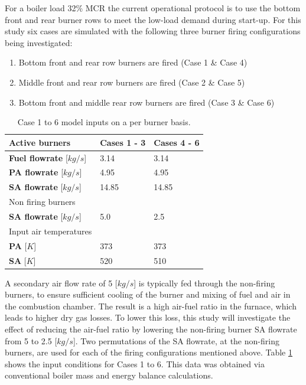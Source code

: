 \documentclass[twocolumn,10pt]{asme2ej}
\begin{document}
For a boiler load 32\% MCR the current operational protocol is to use the bottom front and rear burner rows to meet the low-load demand during start-up.  For this study six cases are simulated with the following three burner firing configurations being investigated:
\begin{enumerate}
\item Bottom front and rear row burners are fired (Case 1 \& Case 4)
\item Middle front and rear row burners are fired (Case 2 \& Case 5)
\item Bottom front and middle rear row burners are fired (Case 3 \& Case 6)
\end{enumerate}
\begin{table}[h!]
\centering
\caption{Case 1 to 6 model inputs on a per burner basis.}
\label{tbl_case_inputs}
\vspace{2mm}
{\tabulinesep=1.2mm
\begin{tabularx}{3.25in}{p{1.25in} p{1in} l}
\hline
Active burners & \textbf{Cases 1 - 3} & \textbf{Cases 4 - 6}\\
\hline
\textbf{Fuel flowrate} [$kg/s$]&3.14  &3.14\\
\textbf{PA flowrate} [$kg/s$]&4.95  &4.95\\
\textbf{SA flowrate} [$kg/s$]&14.85  &14.85\\
\hline
Non firing burners &  & \\
\hline
\textbf{SA flowrate} [$kg/s$]&5.0  &2.5\\
\hline
Input air temperatures& &\\
\hline
\textbf{PA} [$K$]&373  &373\\
\textbf{SA} [$K$]&520  &510\\
\hline
\end{tabularx}}
\vspace{0pt}
\end{table}

A secondary air flow rate of 5 [$kg/s$] is typically fed through the non-firing burners, to ensure sufficient cooling of the burner and mixing of fuel and air in the combustion chamber. The result is a high air-fuel ratio in the furnace, which leads to higher dry gas losses. To lower this loss, this study will investigate the effect of reducing the air-fuel ratio by lowering the non-firing burner SA flowrate from 5 to 2.5 [$kg/s$]. Two permutations of the SA flowrate, at the non-firing burners, are used for each of the firing configurations mentioned above. Table \ref{tbl_case_inputs} shows the input conditions for Cases 1 to 6. This data was obtained via conventional boiler mass and energy balance calculations.
\end{document}
